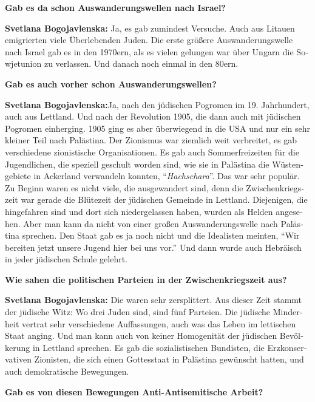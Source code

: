 \begin{otherlanguage}{ngerman}
\textbf{Gab es da schon Auswanderungswellen nach Israel?}

\textbf{Svetlana Bogojavlenska:} Ja, es gab zumindest Versuche. Auch aus Litauen emigrierten viele Überlebenden Juden. Die erste größere Auswanderungswelle nach Israel gab es in den 1970ern, als es vielen gelungen war über Ungarn die Sowjetunion zu verlassen. Und danach noch einmal in den 80ern. 

\textbf{Gab es auch vorher schon Auswanderungswellen?}

\textbf{Svetlana Bogojavlenska:}Ja, nach den jüdischen Pogromen im 19. Jahrhundert, auch aus Lettland. Und nach der Revolution 1905, die dann auch mit jüdischen Pogromen einherging. 1905 ging es aber überwiegend in die USA und nur ein sehr kleiner Teil nach Palästina. Der Zionismus war ziemlich weit verbreitet, es gab verschiedene zionistische Organisationen. Es gab auch Sommerfreizeiten für die Jugendlichen, die speziell geschult worden sind, wie sie in Palästina die Wüstengebiete in Ackerland verwandeln konnten, "`\textit{Hachschara}"'. Das war sehr populär. Zu Beginn waren es nicht viele, die ausgewandert sind, denn die Zwischenkriegszeit war gerade die Blütezeit der jüdischen Gemeinde in Lettland. Diejenigen, die hingefahren sind und dort sich niedergelassen haben, wurden als Helden angesehen. Aber man kann da nicht von einer großen Auswanderungswelle nach Palästina sprechen. Den Staat gab es ja noch nicht und die Idealisten meinten, "`Wir bereiten jetzt unsere Jugend hier bei uns vor."' Und dann wurde auch Hebräisch in jeder jüdischen Schule gelehrt.

\textbf{Wie sahen die politischen Parteien in der Zwischenkriegszeit aus?}

\textbf{Svetlana Bogojavlenska:}  Die waren sehr zersplittert. Aus dieser Zeit stammt der jüdische Witz: Wo drei Juden sind, sind fünf Parteien. Die jüdische Minderheit vertrat sehr verschiedene Auffassungen, auch was das Leben im lettischen Staat anging. Und man kann auch von keiner Homogenität der jüdischen Bevölkerung in Lettland sprechen. Es gab die sozialistischen Bundisten, die Erzkonservativen Zionisten, die sich einen Gottesstaat in Palästina gewünscht hatten, und auch demokratische Bewegungen.

\textbf{Gab es von diesen Bewegungen Anti-Antisemitische Arbeit?}


\end{otherlanguage}
